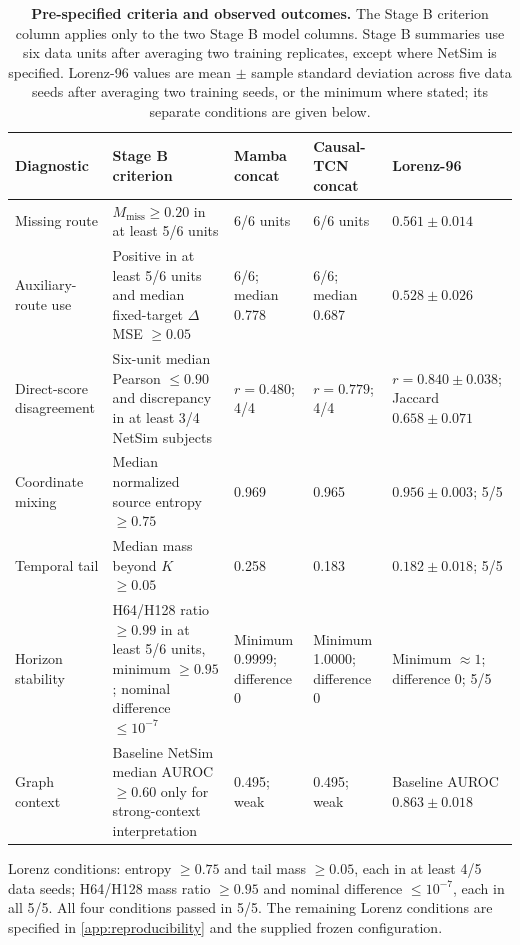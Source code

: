 \begin{table}[!t]
\centering
\caption{\textbf{Pre-specified criteria and observed outcomes.} The Stage B criterion column applies only to the two Stage B model columns. Stage B summaries use six data units after averaging two training replicates, except where NetSim is specified. Lorenz-96 values are mean $\pm$ sample standard deviation across five data seeds after averaging two training seeds, or the minimum where stated; its separate conditions are given below.}
\label{tab:stageb_frozen_gates}
\scriptsize
\renewcommand{\arraystretch}{1.08}
\begin{tabularx}{\textwidth}{p{}p{}p{}p{}Y}
\toprule
Diagnostic & Stage B criterion & Mamba concat & Causal-TCN concat & Lorenz-96 \\
\midrule
Missing route & $M_{\mathrm{miss}}\geq0.20$ in at least 5/6 units & 6/6 units & 6/6 units & $0.561\pm0.014$ \\
Auxiliary-route use & Positive in at least 5/6 units and median fixed-target $\Delta$MSE $\geq0.05$ & 6/6; median 0.778 & 6/6; median 0.687 & $0.528\pm0.026$ \\
Direct-score disagreement & Six-unit median Pearson $\leq0.90$ and discrepancy in at least 3/4 NetSim subjects & $r=0.480$; 4/4 & $r=0.779$; 4/4 & $r=0.840\pm0.038$; Jaccard $0.658\pm0.071$ \\
Coordinate mixing & Median normalized source entropy $\geq0.75$ & 0.969 & 0.965 & $0.956\pm0.003$; 5/5 \\
Temporal tail & Median mass beyond $K$ $\geq0.05$ & 0.258 & 0.183 & $0.182\pm0.018$; 5/5 \\
Horizon stability & H64/H128 ratio $\geq0.99$ in at least 5/6 units, minimum $\geq0.95$; nominal difference $\leq10^{-7}$ & Minimum 0.9999; difference 0 & Minimum 1.0000; difference 0 & Minimum $\approx1$; difference 0; 5/5 \\
Graph context & Baseline NetSim median AUROC $\geq0.60$ only for strong-context interpretation & 0.495; weak & 0.495; weak & Baseline AUROC $0.863\pm0.018$ \\
\bottomrule
\end{tabularx}
\par\smallskip
\begin{minipage}{\textwidth}\scriptsize
Lorenz conditions: entropy $\geq0.75$ and tail mass $\geq0.05$, each in at least 4/5 data seeds; H64/H128 mass ratio $\geq0.95$ and nominal difference $\leq10^{-7}$, each in all 5/5. All four conditions passed in 5/5. The remaining Lorenz conditions are specified in \ref{app:reproducibility} and the supplied frozen configuration.
\end{minipage}
\end{table}

